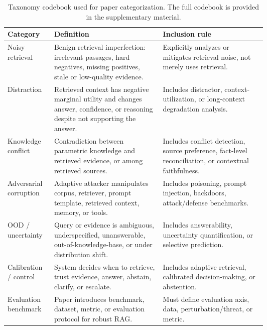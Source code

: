 \documentclass[11pt]{article}
\begin{document}

\begin{table}[t]
\centering
\scriptsize
\begin{tabularx}{\linewidth}{p{0.18\linewidth}p{0.42\linewidth}X}
\toprule
\textbf{Category} & \textbf{Definition} & \textbf{Inclusion rule} \\
\midrule
Noisy retrieval & Benign retrieval imperfection: irrelevant passages, hard negatives, missing positives, stale or low-quality evidence. & Explicitly analyzes or mitigates retrieval noise, not merely uses retrieval. \\
Distraction & Retrieved context has negative marginal utility and changes answer, confidence, or reasoning despite not supporting the answer. & Includes distractor, context-utilization, or long-context degradation analysis. \\
Knowledge conflict & Contradiction between parametric knowledge and retrieved evidence, or among retrieved sources. & Includes conflict detection, source preference, fact-level reconciliation, or contextual faithfulness. \\
Adversarial corruption & Adaptive attacker manipulates corpus, retriever, prompt template, retrieved context, memory, or tools. & Includes poisoning, prompt injection, backdoors, attack/defense benchmarks. \\
OOD / uncertainty & Query or evidence is ambiguous, underspecified, unanswerable, out-of-knowledge-base, or under distribution shift. & Includes answerability, uncertainty quantification, or selective prediction. \\
Calibration / control & System decides when to retrieve, trust evidence, answer, abstain, clarify, or escalate. & Includes adaptive retrieval, calibrated decision-making, or abstention. \\
Evaluation benchmark & Paper introduces benchmark, dataset, metric, or evaluation protocol for robust RAG. & Must define evaluation axis, data, perturbation/threat, or metric. \\
\bottomrule
\end{tabularx}
\caption{Taxonomy codebook used for paper categorization. The full codebook is provided in the supplementary material.}
\label{tab:codebook}
\end{table}

\end{document}
